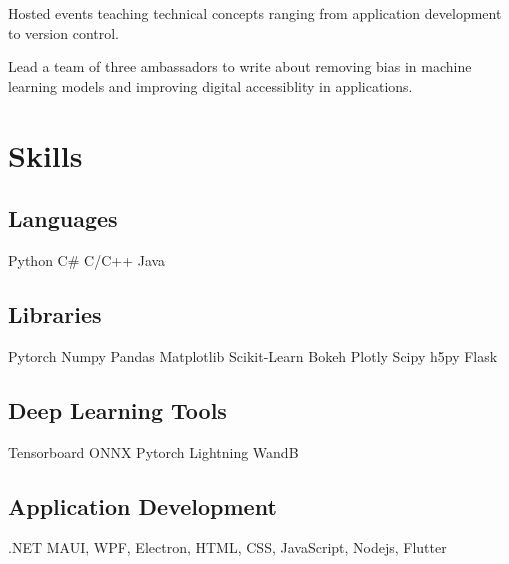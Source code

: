 \documentclass[]{absolute}
\begin{document}
\begin{minipage}[t]{0.65\textwidth}
    \begin{tightemize}
        \item Hosted events teaching technical concepts ranging from application development to version control.
        \item Lead a team of three ambassadors to write about removing bias in machine learning models and improving digital accessiblity in applications.
    \end{tightemize}
    \sectionsep


\end{minipage}
\hfill
\begin{minipage}[t]{0.3\textwidth}


    \section{Skills}
    \subsection{Languages}
    \sectionsep
    Python \textbullet{} C\# \textbullet{} C/C++ \textbullet{} Java \\
    \sectionsep
    \subsection{Libraries}
    \sectionsep
    Pytorch \textbullet{} Numpy \textbullet{} Pandas \textbullet{} Matplotlib \textbullet{} Scikit-Learn \textbullet{} Bokeh \textbullet{} Plotly \textbullet{} Scipy \textbullet{} h5py \textbullet{} Flask
    \sectionsep
    \subsection{Deep Learning Tools}
    \sectionsep
    Tensorboard \textbullet{} ONNX \textbullet{} Pytorch Lightning \textbullet{} WandB
    \sectionsep
    \subsection{Application Development}
    \sectionsep
    .NET MAUI, WPF, Electron, HTML, CSS, JavaScript, Nodejs, Flutter
    \sectionsep

\end{minipage}
\end{document}
